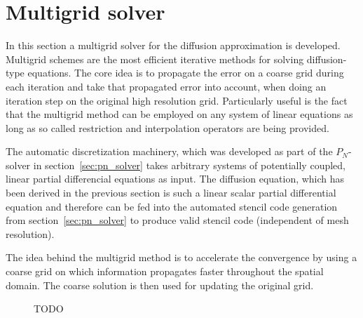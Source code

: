 \section{Multigrid solver}
\label{sec:da_solver}

In this section a multigrid solver for the diffusion approximation is developed. Multigrid schemes are the most efficient iterative methods for solving diffusion-type equations. The core idea is to propagate the error on a coarse grid during each iteration and take that propagated error into account, when doing an iteration step on the original high resolution grid. Particularly useful is the fact that the multigrid method can be employed on any system of linear equations as long as so called restriction and interpolation operators are being provided. 

The automatic discretization machinery, which was developed as part of the $P_N$-solver in section~\ref{sec:pn_solver} takes arbitrary systems of potentially coupled, linear partial differencial equations as input. The diffusion equation, which has been derived in the previous section is such a linear scalar partial differential equation and therefore can be fed into the automated stencil code generation from section~\ref{sec:pn_solver} to produce valid stencil code (independent of mesh resolution).

The idea behind the multigrid method is to accelerate the convergence by using a coarse grid on which information propagates faster throughout the spatial domain. The coarse solution is then used for updating the original grid.
\begin{figure}[h]
\centering
{}
\caption{TODO}
\label{fig:da_solver_multigrid_mesh}
\end{figure}

